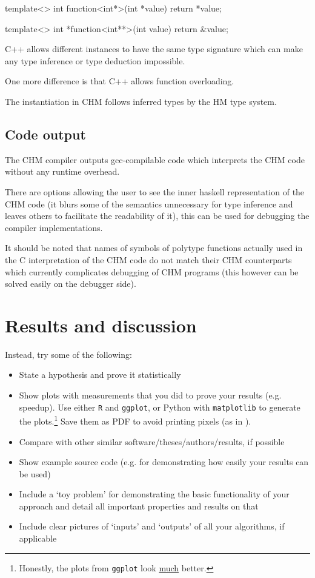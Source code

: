 template<>
int function<int*>(int *value) { return *value; }

template<>
int *function<int**>(int value) { return &value; }

C++ allows different instances to have the same type signature which can make any type inference or type deduction
impossible.

One more difference is that C++ allows function overloading. %

The instantiation in CHM follows inferred types by the HM type system.

\section{Code output}

The CHM compiler outputs gcc-compilable code which interprets the CHM code without any runtime overhead. %

There are options allowing the user to see the inner haskell representation of the CHM code (it blurs some of the semantics
unnecessary for type inference and leaves others to facilitate the readability of it), this can be used for debugging
the compiler implementations. %

It should be noted that names of symbols of polytype functions actually used in the C interpretation of the CHM code do not match
their CHM counterparts which currently complicates debugging of CHM programs (this however can be solved easily on the debugger side).

\chapter{Results and discussion}


Instead, try some of the following:
\begin{itemize}
\item State a hypothesis and prove it statistically
\item Show plots with measurements that you did to prove your results (e.g. speedup). Use either \texttt{R} and \texttt{ggplot}, or Python with \texttt{matplotlib} to generate the plots.\footnote{Honestly, the plots from \texttt{ggplot} look \underline{much} better.} Save them as PDF to avoid printing pixels (as in ).
\item Compare with other similar software/theses/authors/results, if possible
\item Show example source code (e.g. for demonstrating how easily your results can be used)
\item Include a `toy problem' for demonstrating the basic functionality of your approach and detail all important properties and results on that
\item Include clear pictures of `inputs' and `outputs' of all your algorithms, if applicable
\end{itemize}

